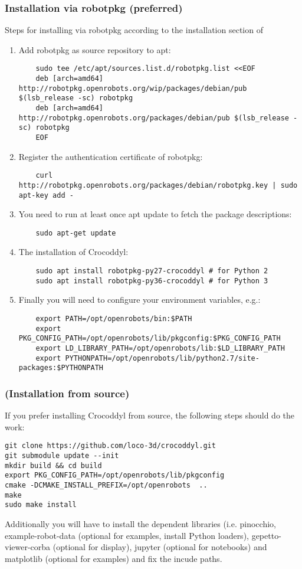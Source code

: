 \subsubsection{Installation via robotpkg (preferred)}
Steps for installing via robotpkg according to the installation section of \cite{crocoddylweb}
\begin{enumerate}
	\item Add robotpkg as source repository to apt:
	\begin{verbatim}
	sudo tee /etc/apt/sources.list.d/robotpkg.list <<EOF
	deb [arch=amd64] http://robotpkg.openrobots.org/wip/packages/debian/pub $(lsb_release -sc) robotpkg
	deb [arch=amd64] http://robotpkg.openrobots.org/packages/debian/pub $(lsb_release -sc) robotpkg
	EOF
	\end{verbatim}
	\item Register the authentication certificate of robotpkg:
	\begin{verbatim}
	curl http://robotpkg.openrobots.org/packages/debian/robotpkg.key | sudo apt-key add -
	\end{verbatim}
	\item You need to run at least once apt update to fetch the package descriptions:
	\begin{verbatim}
	sudo apt-get update
	\end{verbatim}
	\item The installation of Crocoddyl:
	\begin{verbatim}
	sudo apt install robotpkg-py27-crocoddyl # for Python 2
	sudo apt install robotpkg-py36-crocoddyl # for Python 3
	\end{verbatim}
	\item Finally you will need to configure your environment variables, e.g.:
	\begin{verbatim}
	export PATH=/opt/openrobots/bin:$PATH
	export PKG_CONFIG_PATH=/opt/openrobots/lib/pkgconfig:$PKG_CONFIG_PATH
	export LD_LIBRARY_PATH=/opt/openrobots/lib:$LD_LIBRARY_PATH
	export PYTHONPATH=/opt/openrobots/lib/python2.7/site-packages:$PYTHONPATH
	\end{verbatim}
\end{enumerate}

\subsubsection{(Installation from source)}
If you prefer installing Crocoddyl from source, the following steps should do the work:
\begin{verbatim}
git clone https://github.com/loco-3d/crocoddyl.git 
git submodule update --init
mkdir build && cd build
export PKG_CONFIG_PATH=/opt/openrobots/lib/pkgconfig
cmake -DCMAKE_INSTALL_PREFIX=/opt/openrobots  ..
make
sudo make install
\end{verbatim}
Additionally you will have to install the dependent libraries (i.e. pinocchio, example-robot-data (optional for examples, install Python loaders), gepetto-viewer-corba (optional for display), jupyter (optional for notebooks) and matplotlib (optional for examples) and fix the incude paths.

